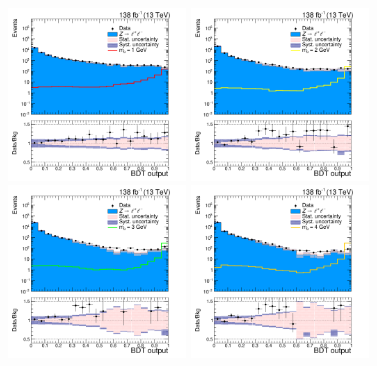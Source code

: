 \begin{figure}[htbp]
  \begin{center}
		\includegraphics[width=0.42\textwidth]{figures/chapter04/BDT_score/mvaVal_M1_log.png}
        \includegraphics[width=0.42\textwidth]{figures/chapter04/BDT_score/mvaVal_M2_log.png} \\
		\includegraphics[width=0.42\textwidth]{figures/chapter04/BDT_score/mvaVal_M3_log.png}
		\includegraphics[width=0.42\textwidth]{figures/chapter04/BDT_score/mvaVal_M4_log.png}\\

\end{center}
\end{figure}
